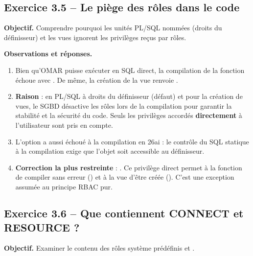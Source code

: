 
\subsection{Exercice 3.5 -- Le piège des rôles dans le code}
\textbf{Objectif.} Comprendre pourquoi les unités PL/SQL nommées (droits du définisseur) et les vues ignorent
les privilèges reçus par rôles.


\textbf{Observations et réponses.}
\begin{enumerate}
  \item Bien qu'OMAR puisse exécuter  en SQL direct, la compilation de la
        fonction  échoue avec . De même, la création de la vue  renvoie .
  \item \textbf{Raison} : en PL/SQL à droits du définisseur (défaut) et pour la création de vues, le SGBD
        désactive les rôles lors de la compilation pour garantir la stabilité et la sécurité du code.
        Seuls les privilèges accordés \textbf{directement} à l'utilisateur sont pris en compte.
  \item L'option  a aussi échoué à la compilation en 26ai : le contrôle du SQL
        statique à la compilation exige que l'objet soit accessible au définisseur.
  \item \textbf{Correction la plus restreinte} : . Ce privilège
        direct permet à la fonction de compiler sans erreur () et à la vue d'être
        créée (). C'est une exception assumée au principe RBAC pur.
\end{enumerate}

\subsection{Exercice 3.6 -- Que contiennent CONNECT et RESOURCE ?}
\textbf{Objectif.} Examiner le contenu des rôles système prédéfinis  et .

